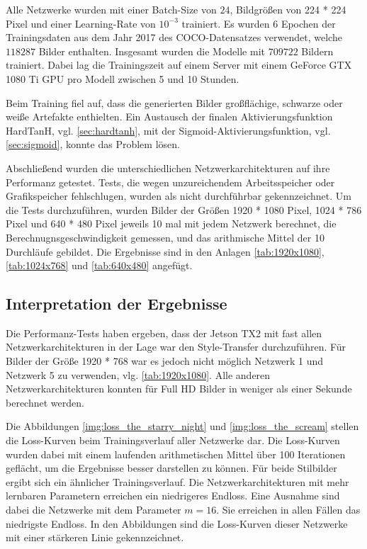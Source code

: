 Alle Netzwerke wurden mit einer Batch-Size von $ 24 $, Bildgrößen von 224 * 224 Pixel und einer Learning-Rate von $ 10^{-3} $ trainiert. Es wurden 6 Epochen der Trainingsdaten aus dem Jahr 2017 des COCO-Datensatzes verwendet, welche $ 118287 $ Bilder enthalten. Insgesamt wurden die Modelle mit $ 709722 $ Bildern trainiert. Dabei lag die Trainingszeit auf einem Server mit einem GeForce GTX 1080 Ti GPU pro Modell zwischen 5 und 10 Stunden.

Beim Training fiel auf, dass die generierten Bilder großflächige, schwarze oder weiße Artefakte enthielten. Ein Austausch der finalen Aktivierungsfunktion HardTanH, vgl. \ref{sec:hardtanh}, mit der Sigmoid-Aktivierungsfunktion, vgl. \ref{sec:sigmoid}, konnte das Problem lösen.

Abschließend wurden die unterschiedlichen Netzwerkarchitekturen auf ihre Performanz getestet. Tests, die wegen unzureichendem Arbeitsspeicher oder Grafikspeicher fehlschlugen, wurden als \textcolor{danger}{nicht durchführbar} gekennzeichnet. Um die Tests durchzuführen, wurden Bilder der Größen 1920 * 1080 Pixel, 1024 * 786 Pixel und 640 * 480 Pixel jeweils 10 mal mit jedem Netzwerk berechnet, die Berechnugnsgeschwindigkeit gemessen, und das arithmische Mittel der 10 Durchläufe gebildet. Die Ergebnisse sind in den Anlagen \ref{tab:1920x1080}, \ref{tab:1024x768} und \ref{tab:640x480} angefügt.

\subsection{Interpretation der Ergebnisse}

Die Performanz-Tests haben ergeben, dass der Jetson TX2 mit fast allen Netzwerkarchitekturen in der Lage war den Style-Transfer durchzuführen. Für Bilder der Größe 1920 * 768  war es jedoch nicht möglich Netzwerk 1 und Netzwerk 5 zu verwenden, vlg. \ref{tab:1920x1080}. Alle anderen Netzwerkarchitekturen konnten für Full HD Bilder in weniger als einer Sekunde berechnet werden.

Die Abbildungen \ref{img:loss_the_starry_night} und \ref{img:loss_the_scream} stellen die Loss-Kurven beim Trainingsverlauf aller Netzwerke dar. Die Loss-Kurven wurden dabei mit einem laufenden arithmetischen Mittel über 100 Iterationen geflächt, um die Ergebnisse besser darstellen zu können. Für beide Stilbilder ergibt sich ein ähnlicher Trainingsverlauf. Die Netzwerkarchitekturen mit mehr lernbaren Parametern erreichen ein niedrigeres Endloss. Eine Ausnahme sind dabei die Netzwerke mit dem Parameter $ m = 16 $. Sie erreichen in allen Fällen das niedrigste Endloss. In den Abbildungen sind die Loss-Kurven dieser Netzwerke mit einer stärkeren Linie gekennzeichnet.

